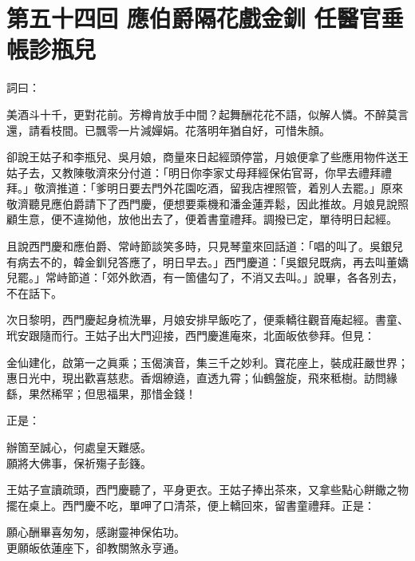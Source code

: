 
\chapter*{第五十四回 應伯爵隔花戲金釧 任醫官垂帳診瓶兒}


詞曰：

\begin{myquote}
美酒斗十千，更對花前。芳樽肯放手中間？起舞酬花花不語，似解人憐。不醉莫言還，請看枝間。已飄零一片減嬋娟。花落明年猶自好，可惜朱顏。

\end{myquote}

卻說王姑子和李瓶兒、吳月娘，商量來日起經頭停當，月娘便拿了些應用物件送王姑子去，又教陳敬濟來分付道：「明日你李家丈母拜經保佑官哥，你早去禮拜禮拜。」敬濟推道：「爹明日要去門外花園吃酒，留我店裡照管，着別人去罷。」原來敬濟聽見應伯爵請下了西門慶，便想要乘機和潘金蓮弄鬆，因此推故。月娘見說照顧生意，便不違拗他，放他出去了，便着書童禮拜。調撥已定，單待明日起經。

且說西門慶和應伯爵、常峙節談笑多時，只見琴童來回話道：「唱的叫了。吳銀兒有病去不的，韓金釧兒答應了，明日早去。」西門慶道：「吳銀兒既病，再去叫董嬌兒罷。」常峙節道：「郊外飲酒，有一箇儘勾了，不消又去叫。」說畢，各各別去，不在話下。

次日黎明，西門慶起身梳洗畢，月娘安排早飯吃了，便乘轎往觀音庵起經。書童、玳安跟隨而行。王姑子出大門迎接，西門慶進庵來，北面皈依參拜。但見：

\begin{myquote}
金仙建化，啟第一之眞乘；玉偈演音，集三千之妙利。寶花座上，裝成莊嚴世界；惠日光中，現出歡喜慈悲。香烟繚遶，直透九霄；仙鶴盤旋，飛來秪樹。訪問緣繇，果然稀罕；但思福果，那惜金錢！
\end{myquote}

正是：

\begin{myquote}
辦箇至誠心，何處皇天難感。\\願將大佛事，保祈殤子彭籛。
\end{myquote}

王姑子宣讀疏頭，西門慶聽了，平身更衣。王姑子捧出茶來，又拿些點心餅饊之物擺在桌上。西門慶不吃，單呷了口清茶，便上轎回來，留書童禮拜。正是：

\begin{myquote}
願心酬畢喜匆匆，感謝靈神保佑功。\\更願皈依蓮座下，卻教關煞永亨通。
\end{myquote}

